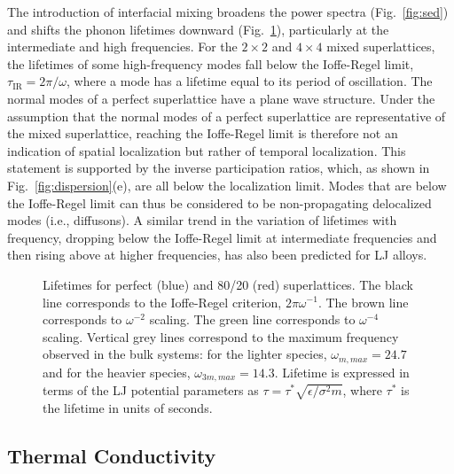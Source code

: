 \documentclass[aps,prb,preprint,preprintnumbers,amsmath,amssymb,floatfix,superscriptaddress]{revtex4}
\begin{document}
The introduction of interfacial mixing broadens the power spectra (Fig.~\ref{fig:sed}) and shifts the phonon lifetimes downward (Fig.~\ref{FIG:lifetime}), particularly at the intermediate and high frequencies. For the $2 \times 2$ and $ 4 \times 4$ mixed superlattices,  the lifetimes of some high-frequency modes fall below the Ioffe-Regel limit, $\tau_\mathrm{IR} =2\pi/\omega$, where a mode has a lifetime equal to its period of oscillation. The normal modes of a perfect superlattice have a plane wave structure. Under the assumption that the normal modes of a perfect superlattice are representative of the mixed superlattice, reaching the Ioffe-Regel limit is therefore not an indication of spatial localization but rather of temporal localization. This statement is supported by the inverse participation ratios, which, as shown in Fig.~\ref{fig:dispersion}(e), are all below the localization limit. Modes that are below the Ioffe-Regel limit can thus be considered to be non-propagating delocalized modes (i.e., diffusons).\cite{allen_thermal_1993,allen1999diffusons} A similar trend in the variation of lifetimes with frequency, dropping below the Ioffe-Regel limit at intermediate frequencies and then rising above at higher frequencies, has also been predicted for LJ alloys.\cite{larkin2013predicting} 

\renewcommand{\textfraction}{0.0}
\begin{figure}%
\begin{center}
\renewcommand{\figure}{Fig.}
\caption{Lifetimes for perfect (blue) and 80/20 (red) superlattices. The black line corresponds to the Ioffe-Regel criterion, $2\pi\omega^{-1}$. The brown line corresponds to $\omega^{-2}$ scaling. The green line corresponds to $\omega^{-4}$ scaling. Vertical grey lines correspond to the maximum frequency observed in the bulk systems: for the lighter species, $\omega_{m,max}=24.7$ and for the heavier species, $\omega_{3m,max}=14.3$. {\color{red}Lifetime is expressed in terms of the LJ potential parameters as $\tau=\tau^*\sqrt{\epsilon/\sigma^2m}$, where $\tau^*$ is the lifetime in units of seconds.} 
} 
\label{FIG:lifetime}
\end{center}
\end{figure}

\subsection{Thermal Conductivity}
\end{document}
